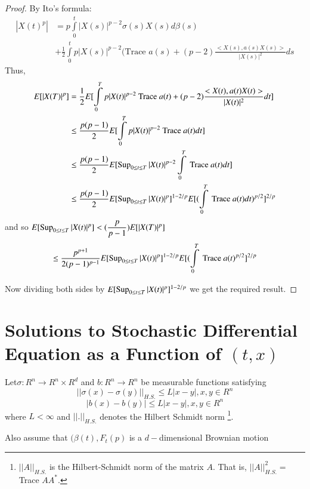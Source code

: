 \begin{proof}
By Ito's formula:
\begin{align*}
|X (t)^p |& = p \int\limits_{0}^{t} |X (s) |^{p-2} \sigma (s) X (s) d
\beta (s)\\ 
& + \frac{1}{2} \int\limits_{0}^{t} p |X (s) |^{p-2} (\text {Trace } a
(s) + (p-2) \frac{< X (s), a(s) X (s) >}{|X (s) |^2}ds 
\end{align*}
Thus,
{\fontsize{10pt}{12pt}\selectfont
\begin{align*}
E[ |X(T)|^p]& = \frac{1}{2}E[\int\limits^T_0 p|X(t)|^{p-2} \text{
    Trace } a(t) +(p-2)\frac{< X (t), a(t) X (t) >}{|X (t) |^2}dt]\\ 
& \leq \frac{p(p-1)}{2}E[\int\limits^T_0 p|X(t)|^{p-2} \text{ Trace }
  a(t) dt ]\\ 
& \leq \frac{p(p-1)}{2}E[\operatorname{Sup}_{0 \leq t \leq T}|X(t)|^{p-2} \int
  \limits^T_0 \text{ Trace } a(t) dt ]\\ 
& \leq \frac{p(p-1)}{2}E[\operatorname{Sup}_{0 \leq t \leq
    T}|X(t)|^{p}]^{1-2/p}E[(\int \limits^T_0 \text{ Trace }
  a(t)dt)^{p/2}]^{2/p}
\end{align*}}\relax
and so  
$E[\operatorname{Sup} \limits_{0 \leq t \leq T}|X(t)|^p] < (\dfrac{p}{p-1}) E[
  |X(T)|^p]$ 
$$
\leq \frac{p^{p+1}}{2(p-1)^{p-1}} E[\operatorname{Sup} \limits_{0 \leq t \leq
    T}|X(t)|^p]^{1-2/p} E[(\int\limits^T_0 \text{ Trace } a(t)^{p/2}]^{2/p} 
$$

Now dividing both sides by $E[\operatorname{Sup} \limits_{0 \leq t \leq
    T}|X(t)|^p]^{1-2/p}$ we get the required result. 
\end{proof}


\section[Solutions to Stochastic Differential Equation....]{Solutions to Stochastic Differential Equation as a Function
  of $(t,x)$}\label{chap1:sec2}%

Let\pageoriginale $\sigma:R^n \to R^n \times R^d$ and $b: R^n \to R^n$
be measurable functions satisfying   
$$
|| \sigma(x)- \sigma(y) ||_{H.S.} \leq L|x-y| , x,y \in R^n
$$
\begin{equation*}
|b(x)-b(y)| \leq L|x-y|, x,y \in R^n \tag{2.1}\label{chap1:eq2.1}  
\end{equation*}
where $L < \infty$ and $||.||_{H.S.}$ denotes the Hilbert Schmidt
norm \footnote{$||A||_{H.S.}$ is the Hilbert-Schmidt norm of the
  matrix $A$. That is, $||A||^2_{H.S.}=$ Trace $AA^{\ast}$.}. 

Also assume that $(\beta(t), F_t(p)$ is a $d-$dimensional Brownian
motion   

